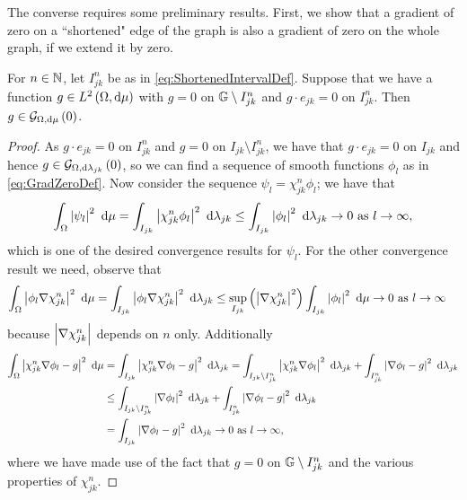 The converse requires some preliminary results.
First, we show that a gradient of zero on a ``shortened" edge of the graph is also a gradient of zero on the whole graph, if we extend it by zero.
\begin{lemma} \label{lem:SegGradExtend}
	For $n\in\mathbb{N}$, let $I_{jk}^n$ be as in \eqref{eq:ShortenedIntervalDef}.
	Suppose that we have a function $g\in L^{2}\left( \Omega,\mathrm{d}\mu \right)$ with $g=0$ on $\mathbb{G}\setminus I_{jk}^{n}$ and $g\cdot e_{jk}=0$ on $I_{jk}^{n}$.
	Then $g\in\mathcal{G}_{ \Omega, \mathrm{d}\mu}\left( 0 \right)$.
\end{lemma}
\begin{proof}
	As $g\cdot e_{jk}=0$ on $I_{jk}^{n}$ and $g=0$ on $I_{jk}\setminus I_{jk}^{n}$, we have that $g\cdot e_{jk}=0$ on $I_{jk}$ and hence $g\in\mathcal{G}_{ \Omega, \mathrm{d}\lambda_{jk}}\left( 0 \right)$, so we can find a sequence of smooth functions $\phi_l$ as in \eqref{eq:GradZeroDef}.
	Now consider the sequence $\psi_l = \chi_{jk}^{n}\phi_l$; we have that
	\begin{align*}
		\int_{\Omega}\left\lvert \psi_l \right\rvert^2 \ \mathrm{d}\mu = \int_{I_{jk}}\left\lvert \chi_{jk}^{n}\phi_l \right\rvert^2 \ \mathrm{d}\lambda_{jk}
		\leq \int_{I_{jk}}\left\lvert \phi_l \right\rvert^2 \ \mathrm{d}\lambda_{jk} \rightarrow0 \ \text{as} \ l \rightarrow\infty,
	\end{align*}
	which is one of the desired convergence results for $\psi_l$.
	For the other convergence result we need, observe that
	\begin{align*}
		\int_{\Omega}\left\lvert \phi_l\nabla\chi_{jk}^{n} \right\rvert^2 \ \mathrm{d}\mu 
		&= \int_{I_{jk}}\left\lvert \phi_l\nabla\chi_{jk}^{n} \right\rvert^2 \ \mathrm{d}\lambda_{jk}
		\leq \sup_{I_{jk}}\left( \left\lvert \nabla\chi_{jk}^{n} \right\rvert^{2} \right)\int_{I_{jk}}\left\lvert \phi_l \right\rvert^2 \ \mathrm{d}\mu
		\rightarrow 0 \ \text{as} \ l \rightarrow\infty
	\end{align*}
	because $\left\lvert \nabla\chi_{jk}^{n} \right\rvert$ depends on $n$ only.
	Additionally
	\begin{align*}
		\int_{\Omega}\left\lvert \chi_{jk}^n\nabla\phi_l - g \right\rvert^2 \ \mathrm{d}\mu &= \int_{I_{jk}}\left\lvert \chi_{jk}^n\nabla\phi_l - g \right\rvert^2 \ \mathrm{d}\lambda_{jk}
		= \int_{I_{jk}\setminus I_{jk}^n}\left\lvert \chi_{jk}^n\nabla\phi_l \right\rvert^2 \ \mathrm{d}\lambda_{jk}
		+  \int_{I_{jk}^n}\left\lvert \nabla\phi_l - g \right\rvert^2 \ \mathrm{d}\lambda_{jk} \\
		&\leq \int_{I_{jk}\setminus I_{jk}^n}\left\lvert \nabla\phi_l \right\rvert^2 \ \mathrm{d}\lambda_{jk} +  \int_{I_{jk}^n}\left\lvert \nabla\phi_l - g \right\rvert^2 \ \mathrm{d}\lambda_{jk} \\
		&= \int_{I_{jk}}\left\lvert \nabla\phi_l - g \right\rvert^2 \ \mathrm{d}\lambda_{jk} \rightarrow0 \ \text{as} \ l \rightarrow\infty,
	\end{align*}
	where we have made use of the fact that $g=0$ on $\mathbb{G}\setminus I_{jk}^n$ and the various properties of $\chi_{jk}^n$.

\end{proof}
